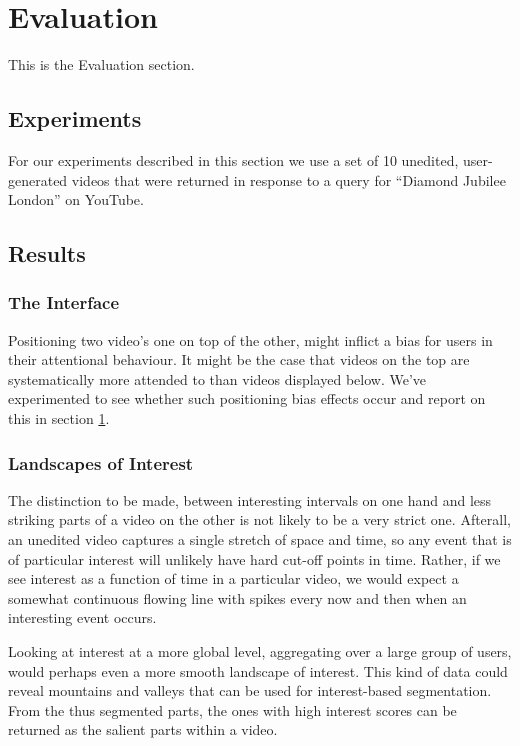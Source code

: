 \chapter{Evaluation}
\label{ch:evaluation}

This is the Evaluation section.

\section{Experiments}
For our experiments described in this section we use a set of 10 unedited, user-generated videos that were returned in response to a query for ``Diamond Jubilee London'' on YouTube.




\section{Results}

\subsection{The Interface}
Positioning two video's one on top of the other, might inflict a bias for users in their attentional behaviour. It might be the case that videos on the top are systematically more attended to than videos displayed below. We've experimented to see whether such positioning bias effects occur and report on this in section \ref{ch:evaluation}.


\subsection{Landscapes of Interest}

The distinction to be made, between interesting intervals on one hand and less striking parts of a video on the other is not likely to be a very strict one. Afterall, an unedited video captures a single stretch of space and time, so any event that is of particular interest will unlikely have hard cut-off points in time. Rather, if we see interest as a function of time in a particular video, we would expect a somewhat continuous flowing line with spikes every now and then when an interesting event occurs. 

Looking at interest at a more global level, aggregating over a large group of users, would perhaps even a more smooth landscape of interest. This kind of data could reveal mountains and valleys that can be used for interest-based segmentation. From the thus segmented parts, the ones with high interest scores can be returned as the salient parts within a video.